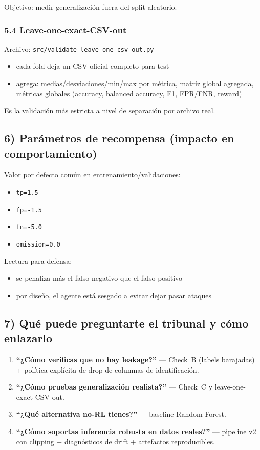 ﻿\documentclass[12pt,a4paper]{article}
\begin{document}
Objetivo: medir generalización fuera del split aleatorio.

\subsubsection{5.4 Leave-one-exact-CSV-out}

Archivo: \verb|src/validate_leave_one_csv_out.py|

\begin{itemize}
  \item cada fold deja un CSV oficial completo para test
  \item agrega: medias/desviaciones/min/max por métrica, matriz global agregada, métricas globales
        (accuracy, balanced accuracy, F1, FPR/FNR, reward)
\end{itemize}

Es la validación más estricta a nivel de separación por archivo real.

\subsection{6) Parámetros de recompensa (impacto en comportamiento)}

Valor por defecto común en entrenamiento/validaciones:

\begin{itemize}
  \item \texttt{tp=1.5}
  \item \texttt{fp=-1.5}
  \item \texttt{fn=-5.0}
  \item \texttt{omission=0.0}
\end{itemize}

Lectura para defensa:

\begin{itemize}
  \item se penaliza más el falso negativo que el falso positivo
  \item por diseño, el agente está sesgado a evitar dejar pasar ataques
\end{itemize}

\subsection{7) Qué puede preguntarte el tribunal y cómo enlazarlo}

\begin{enumerate}
  \item \textbf{``¿Cómo verificas que no hay leakage?''} --- Check~B (labels barajadas) + política
        explícita de drop de columnas de identificación.
  \item \textbf{``¿Cómo pruebas generalización realista?''} --- Check~C y
        leave-one-exact-CSV-out.
  \item \textbf{``¿Qué alternativa no-RL tienes?''} --- baseline Random Forest.
  \item \textbf{``¿Cómo soportas inferencia robusta en datos reales?''} --- pipeline v2 con
        clipping + diagnósticos de drift + artefactos reproducibles.
\end{enumerate}
\end{document}
